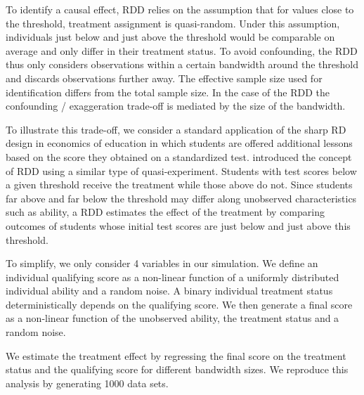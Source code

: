 \documentclass[12pt]{article}
\begin{document}
        To identify a causal effect, RDD relies on the assumption that for values close to the threshold, treatment assignment is quasi-random. Under this assumption, individuals just below and just above the threshold would be comparable on average and only differ in their treatment status. To avoid confounding, the RDD thus only considers observations within a certain bandwidth around the threshold and discards observations further away. The effective sample size used for identification differs from the total sample size. In the case of the RDD the confounding / exaggeration trade-off is mediated by the size of the bandwidth.
        
        To illustrate this trade-off, we consider a standard application of the sharp RD design in economics of education in which students are offered additional lessons based on the score they obtained on a standardized test. \cite{thistlethwaite_regression-discontinuity_1960} introduced the concept of RDD using a similar type of quasi-experiment. Students with test scores below a given threshold receive the treatment while those above do not. Since students far above and far below the threshold may differ along unobserved characteristics such as ability, a RDD estimates the effect of the treatment by comparing outcomes of students whose initial test scores are just below and just above this threshold. 
        
        To simplify, we only consider 4 variables in our simulation. We define an individual qualifying score as a non-linear function of a uniformly distributed individual ability and a random noise. A binary individual treatment status deterministically depends on the qualifying score. We then generate a final score as a non-linear function of the unobserved ability, the treatment status and a random noise. 
        
        We estimate the treatment effect by regressing the final score on the treatment status and the qualifying score for different bandwidth sizes. We reproduce this analysis by generating 1000 data sets. %
        
\end{document}
